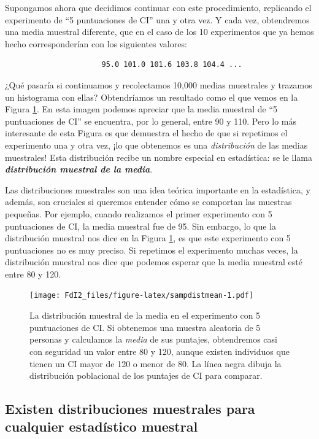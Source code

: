 \documentclass[spanish,]{book}
\begin{document}
Supongamos ahora que decidimos continuar con este procedimiento,
replicando el experimento de ``5 puntuaciones de CI'' una y otra vez. Y
cada vez, obtendremos una media muestral diferente, que en el caso de
los 10 experimentos que ya hemos hecho corresponderían con los
siguientes valores:

\begin{verbatim}
                      95.0 101.0 101.6 103.8 104.4 ...
\end{verbatim}

¿Qué pasaría si continuamos y recolectamos 10,000 medias muestrales y
trazamos un histograma con ellas? Obtendríamos un resultado como el que
vemos en la Figura \ref{fig:sampdistmean}. En esta imagen podemos
apreciar que la media muestral de ``5 puntuaciones de CI'' se encuentra,
por lo general, entre 90 y 110. Pero lo más interesante de esta Figura
es que demuestra el hecho de que si repetimos el experimento una y otra
vez, ¡lo que obtenemos es una \emph{distribución} de las medias
muestrales! Esta distribución recibe un nombre especial en estadística:
se le llama \textbf{\emph{distribución muestral de la media}}.

Las distribuciones muestrales son una idea teórica importante en la
estadística, y además, son cruciales si queremos entender cómo se
comportan las muestras pequeñas. Por ejemplo, cuando realizamos el
primer experimento con 5 puntuaciones de CI, la media muestral fue de
95. Sin embargo, lo que la distribución muestral nos dice en la Figura
\ref{fig:sampdistmean}, es que este experimento con 5 puntuaciones no es
muy preciso. Si repetimos el experimento muchas veces, la distribución
muestral nos dice que podemos esperar que la media muestral esté entre
80 y 120.

\begin{figure}
\centering
\texttt{[image: FdI2\_files/figure-latex/sampdistmean-1.pdf]}
\caption{\label{fig:sampdistmean}La distribución muestral de la media en el
experimento con 5 puntuaciones de CI. Si obtenemos una muestra aleatoria
de 5 personas y calculamos la \emph{media} de sus puntajes, obtendremos
casi con seguridad un valor entre 80 y 120, aunque existen individuos
que tienen un CI mayor de 120 o menor de 80. La línea negra dibuja la
distribución poblacional de los puntajes de CI para comparar.}
\end{figure}

\subsection{Existen distribuciones muestrales para cualquier estadístico
muestral}\label{existen-distribuciones-muestrales-para-cualquier-estadistico-muestral}
\end{document}
